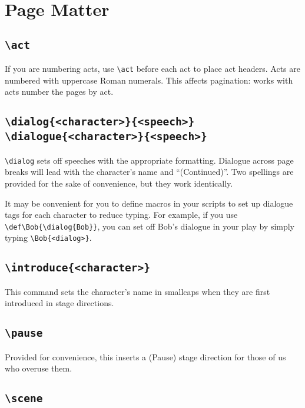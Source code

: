 \documentclass{report}
\begin{document}
\section{Page Matter}

\cprotect\subsection{\verb|\act|}

If you are numbering acts, use \verb|\act| before each act to place act headers. Acts are numbered with uppercase Roman numerals. This affects pagination: works with acts number the pages by act.

\cprotect\subsection[\verb|\dialog{<character>}{<speech>}| \verb|\dialogue{<character>}{<speech>}|]{\verb|\dialog{<character>}{<speech>}|\\\verb|\dialogue{<character>}{<speech>}|}

\verb|\dialog| sets off speeches with the appropriate formatting. Dialogue across page breaks will lead with the character’s name and “(Continued)”. Two spellings are provided for the sake of convenience, but they work identically.

It may be convenient for you to define macros in your scripts to set up dialogue tags for each character to reduce typing. For example, if you use \verb|\def\Bob{\dialog{Bob}}|, you can set off Bob’s dialogue in your play by simply typing \verb|\Bob{<dialog>}|.

\cprotect\subsection{\verb|\introduce{<character>}|}

This command sets the character’s name in smallcaps when they are first introduced in stage directions.

\cprotect\subsection{\verb|\pause|}

Provided for convenience, this inserts a (Pause) stage direction for those of us who overuse them.

\cprotect\subsection{\verb|\scene|}
\end{document}
